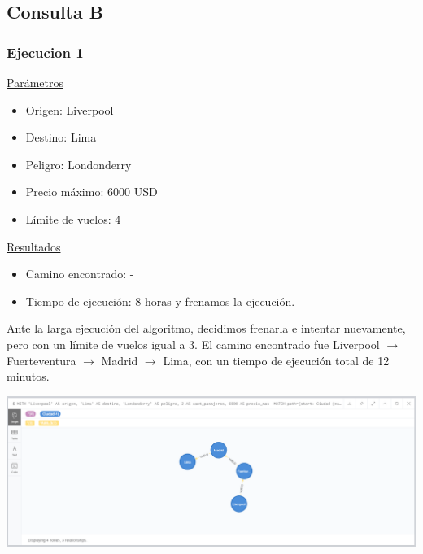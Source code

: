 \documentclass[a4paper,11pt]{article}
\begin{document}
\subsection*{Consulta B}
\subsubsection*{Ejecucion 1}
\noindent
\underline{Parámetros}
\begin{itemize}
\item Origen: Liverpool
\item Destino: Lima
\item Peligro: Londonderry
\item Precio máximo: 6000 USD
\item Límite de vuelos: 4
\end{itemize}
\underline{Resultados}
\begin{itemize}
\item Camino encontrado: -
\item Tiempo de ejecución: 8 horas y frenamos la ejecución.
\end{itemize}
Ante la larga ejecución del algoritmo, decidimos frenarla e intentar nuevamente, pero con un límite de vuelos igual a 3.
El camino encontrado fue Liverpool $\rightarrow$ Fuerteventura $\rightarrow$ Madrid $\rightarrow$ Lima, con un tiempo de ejecución total de 12 minutos.\\
\begin{center}
\includegraphics[scale=0.40]{./imagenes/consultaB-ejec1.png}
\end{center}
\end{document}
